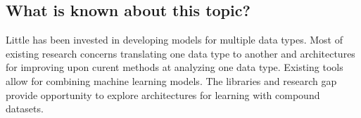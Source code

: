 \subsection{What is known about this topic?}

Little has been invested in developing models for multiple data types. Most of existing research concerns translating one data type to another and architectures for improving upon curent methods at analyzing one data type. Existing tools allow for combining machine learning models. The libraries and research gap provide opportunity to explore architectures for learning with compound datasets.  
